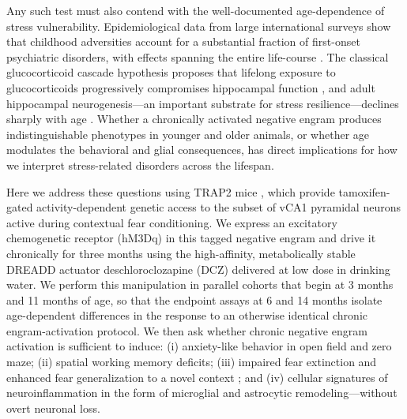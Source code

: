 Any such test must also contend with the well-documented age-dependence of stress vulnerability. Epidemiological data from large international surveys show that childhood adversities account for a substantial fraction of first-onset psychiatric disorders, with effects spanning the entire life-course \cite{kessler2010childhood}. The classical glucocorticoid cascade hypothesis proposes that lifelong exposure to glucocorticoids progressively compromises hippocampal function \cite{sapolsky1986glucocorticoid}, and adult hippocampal neurogenesis---an important substrate for stress resilience---declines sharply with age \cite{klempin2007neurogenesis}. Whether a chronically activated negative engram produces indistinguishable phenotypes in younger and older animals, or whether age modulates the behavioral and glial consequences, has direct implications for how we interpret stress-related disorders across the lifespan.

Here we address these questions using TRAP2 mice \cite{denardo2019temporal}, which provide tamoxifen-gated activity-dependent genetic access to the subset of vCA1 pyramidal neurons active during contextual fear conditioning. We express an excitatory chemogenetic receptor (hM3Dq) in this tagged negative engram and drive it chronically for three months using the high-affinity, metabolically stable DREADD actuator deschloroclozapine (DCZ) \cite{nagai2020dcz,roth2016dreadds} delivered at low dose in drinking water. We perform this manipulation in parallel cohorts that begin at 3 months and 11 months of age, so that the endpoint assays at 6 and 14 months isolate age-dependent differences in the response to an otherwise identical chronic engram-activation protocol. We then ask whether chronic negative engram activation is sufficient to induce: (i) anxiety-like behavior in open field and zero maze; (ii) spatial working memory deficits; (iii) impaired fear extinction and enhanced fear generalization to a novel context \cite{maren2013contextual,tovote2015circuits}; and (iv) cellular signatures of neuroinflammation in the form of microglial and astrocytic remodeling---without overt neuronal loss.


